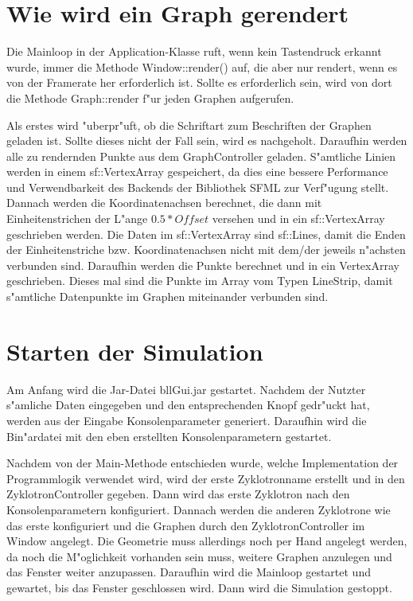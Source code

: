 \documentclass[14pt, a4paper]{report}
\begin{document}
\section{Wie wird ein Graph gerendert}
Die Mainloop in der Application-Klasse ruft, wenn kein Tastendruck erkannt wurde, immer
die Methode Window::render() auf, die aber nur rendert, wenn es von der Framerate her
erforderlich ist. Sollte es erforderlich sein, wird von dort die Methode Graph::render
f"ur jeden Graphen aufgerufen.

Als erstes wird "uberpr"uft, ob die Schriftart zum Beschriften der Graphen geladen ist.
Sollte dieses nicht der Fall sein, wird es nachgeholt. Daraufhin werden alle zu 
rendernden Punkte aus dem GraphController geladen. S"amtliche Linien werden in 
einem sf::VertexArray gespeichert, da dies eine bessere Performance und Verwendbarkeit des
Backends der Bibliothek SFML zur Verf"ugung stellt. Dannach werden die Koordinatenachsen 
berechnet, die dann mit Einheitenstrichen der L"ange $0.5 * Offset$ versehen und
in ein sf::VertexArray geschrieben werden. 
Die Daten im sf::VertexArray sind sf::Lines, damit die Enden der Einheitenstriche 
bzw. Koordinatenachsen nicht mit dem/der jeweils
n"achsten verbunden sind. Daraufhin werden die Punkte berechnet und in ein VertexArray
geschrieben. Dieses mal sind die Punkte im Array vom Typen LineStrip, damit 
s"amtliche Datenpunkte im Graphen miteinander verbunden sind.

\section{Starten der Simulation}
Am Anfang wird die Jar-Datei bllGui.jar gestartet. Nachdem der Nutzter s"amliche Daten
eingegeben und den entsprechenden Knopf gedr"uckt hat, werden aus der Eingabe 
Konsolenparameter generiert. Daraufhin wird die Bin"ardatei mit den eben erstellten
Konsolenparametern gestartet.

Nachdem von der Main-Methode entschieden wurde, welche Implementation der Programmlogik verwendet wird,
wird der erste Zyklotronname erstellt und in den ZyklotronController gegeben. Dann
wird das erste Zyklotron nach den Konsolenparametern konfiguriert. Dannach werden die
anderen Zyklotrone wie das erste konfiguriert und die Graphen durch den
ZyklotronController im Window angelegt. Die Geometrie muss allerdings noch per Hand 
angelegt werden, da noch die M"oglichkeit vorhanden sein muss, weitere Graphen anzulegen
und das Fenster weiter anzupassen. Daraufhin wird die Mainloop gestartet und gewartet,
bis das Fenster geschlossen wird. Dann wird die Simulation gestoppt.
\end{document}
